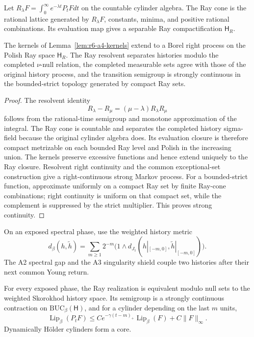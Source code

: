Let \(R_\lambda F=\int_0^\infty e^{-\lambda t}P_tFdt\) on the countable
cylinder algebra.  The Ray cone is the rational lattice generated by
\(R_\lambda F\), constants, minima, and positive rational combinations.  Its
evaluation map gives a separable Ray compactification \(\mathsf H_R\).

\begin{theorem}
\label{thm:r6-a4-ray}
The kernels of Lemma~\ref{lem:r6-a4-kernels} extend to a Borel right process
on the Polish Ray space \(\mathsf H_R\).  The Ray resolvent separates histories
modulo the completed \(\nu\)-null relation, the completed measurable sets
agree with those of the original history process, and the transition
semigroup is strongly continuous in the bounded-strict topology generated by
compact Ray sets.
\end{theorem}

\begin{proof}
The resolvent identity
\[
R_\lambda-R_\mu=(\mu-\lambda)R_\lambda R_\mu
\]
follows from the rational-time semigroup and monotone approximation of the
integral.  The Ray cone is countable and separates the completed history
sigma-field because the original cylinder algebra does.  Its evaluation
closure is therefore compact metrizable on each bounded Ray level and Polish
in the increasing union.  The kernels preserve excessive functions and hence
extend uniquely to the Ray closure.  Resolvent right continuity and the common
exceptional-set construction give a right-continuous strong Markov process.
For a bounded-strict function, approximate uniformly on a compact Ray set by
finite Ray-cone combinations; right continuity is uniform on that compact set,
while the complement is suppressed by the strict multiplier.  This proves
strong continuity.
\end{proof}

On an exposed spectral phase, use the weighted history metric
\[
d_\beta(h,\tilde h)=
\sum_{m\ge1}2^{-m}
\bigl(1\wedge d_{J_1}(h|_{[-m,0]},\tilde h|_{[-m,0]})\bigr).
\]
The A2 spectral gap and the A3 singularity shield couple two histories after
their next common Young return.

\begin{theorem}
\label{thm:r6-a4-feller}
For every exposed phase, the Ray realization is equivalent modulo null sets to
the weighted Skorokhod history space.  Its semigroup is a strongly continuous
contraction on \(\mathrm{BUC}_\beta(\mathsf H)\), and for a cylinder depending
on the last \(m\) units,
\[
\operatorname{Lip}_\beta(P_tF)
\le Ce^{-\gamma(t-m)_+}\operatorname{Lip}_\beta(F)+C\|F\|_\infty.
\]
Dynamically Hölder cylinders form a core.
\end{theorem}

